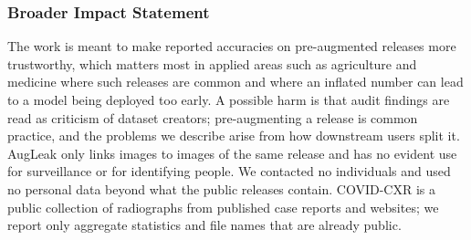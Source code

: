 \subsubsection*{Broader Impact Statement}
The work is meant to make reported accuracies on pre-augmented releases more trustworthy, which matters most in applied areas such as agriculture and medicine where such releases are common and where an inflated number can lead to a model being deployed too early. A possible harm is that audit findings are read as criticism of dataset creators; pre-augmenting a release is common practice, and the problems we describe arise from how downstream users split it. AugLeak only links images to images of the same release and has no evident use for surveillance or for identifying people. We contacted no individuals and used no personal data beyond what the public releases contain. COVID-CXR is a public collection of radiographs from published case reports and websites; we report only aggregate statistics and file names that are already public.
